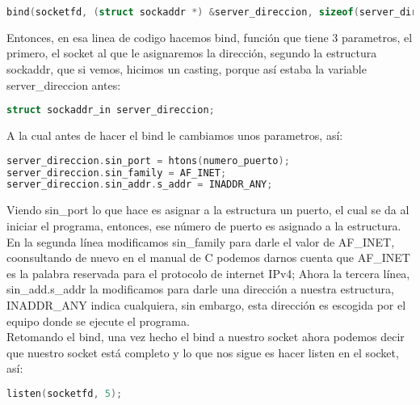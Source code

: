 \documentclass{article}
\begin{document}
\begin{lstlisting}[language=C]
bind(socketfd, (struct sockaddr *) &server_direccion, sizeof(server_direccion))
\end{lstlisting}


Entonces, en esa linea de codigo hacemos bind, función que tiene 3 parametros, el primero, el socket al que le asignaremos la dirección, segundo la estructura sockaddr, que si vemos, hicimos un casting, porque así estaba la variable server\_direccion antes:


\begin{lstlisting}[language=C]
struct sockaddr_in server_direccion;
\end{lstlisting}


A la cual antes de hacer el bind le cambiamos unos parametros, así:


\begin{lstlisting}[language=C]
server_direccion.sin_port = htons(numero_puerto);
server_direccion.sin_family = AF_INET;
server_direccion.sin_addr.s_addr = INADDR_ANY;
\end{lstlisting}


Viendo sin\_port lo que hace es asignar a la estructura un puerto, el cual se da al iniciar el programa, entonces, ese número de puerto es asignado a la estructura. En la segunda línea modificamos sin\_family para darle el valor de AF\_INET, coonsultando de nuevo en el manual de C podemos darnos cuenta que AF\_INET\cite{man7ip} es la palabra reservada para el protocolo de internet IPv4; Ahora la tercera línea, sin\_add.s\_addr la modificamos para darle una dirección a nuestra estructura, INADDR\_ANY indica cualquiera, sin embargo, esta dirección es escogida por el equipo donde se ejecute el programa.\\ 
Retomando el bind, una vez hecho el bind a nuestro socket ahora podemos decir que nuestro socket está completo y lo que nos sigue es hacer listen en el socket, así:


\begin{lstlisting}[language=C]
listen(socketfd, 5);
\end{lstlisting}
\end{document}
